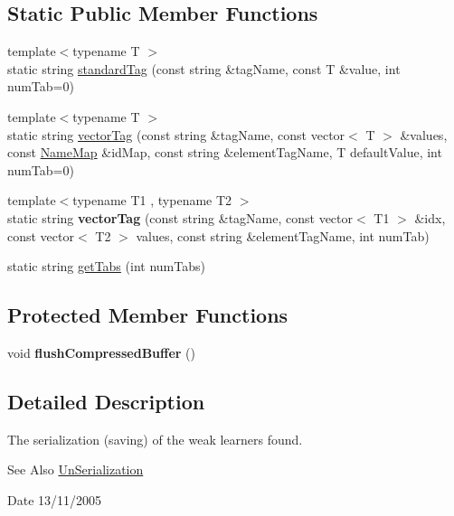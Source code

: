 \subsection*{Static Public Member Functions}
\begin{DoxyCompactItemize}
\item 
{\footnotesize template$<$typename T $>$ }\\static string \hyperlink{classMultiBoost_1_1Serialization_ad75f8e13f32130be1ba110393598f50e}{standard\-Tag} (const string \&tag\-Name, const T \&value, int num\-Tab=0)
\item 
{\footnotesize template$<$typename T $>$ }\\static string \hyperlink{classMultiBoost_1_1Serialization_aeb1f7e2ddfd0e58d4f3d5a5ec78e9f33}{vector\-Tag} (const string \&tag\-Name, const vector$<$ T $>$ \&values, const \hyperlink{classMultiBoost_1_1NameMap}{Name\-Map} \&id\-Map, const string \&element\-Tag\-Name, T default\-Value, int num\-Tab=0)
\item 
\hypertarget{classMultiBoost_1_1Serialization_ab5d8d0ae3de812cf2d7e38c5ce16a64e}{{\footnotesize template$<$typename T1 , typename T2 $>$ }\\static string {\bfseries vector\-Tag} (const string \&tag\-Name, const vector$<$ T1 $>$ \&idx, const vector$<$ T2 $>$ values, const string \&element\-Tag\-Name, int num\-Tab)}\label{classMultiBoost_1_1Serialization_ab5d8d0ae3de812cf2d7e38c5ce16a64e}

\item 
static string \hyperlink{classMultiBoost_1_1Serialization_a0c0e939afedf8c527ee014737583ae78}{get\-Tabs} (int num\-Tabs)
\end{DoxyCompactItemize}
\subsection*{Protected Member Functions}
\begin{DoxyCompactItemize}
\item 
\hypertarget{classMultiBoost_1_1Serialization_a2e68086de33875ac58a1b927298ea084}{void {\bfseries flush\-Compressed\-Buffer} ()}\label{classMultiBoost_1_1Serialization_a2e68086de33875ac58a1b927298ea084}

\end{DoxyCompactItemize}


\subsection{Detailed Description}
The serialization (saving) of the weak learners found. \begin{DoxySeeAlso}{See Also}
\hyperlink{classMultiBoost_1_1UnSerialization}{Un\-Serialization} 
\end{DoxySeeAlso}
\begin{DoxyDate}{Date}
13/11/2005 
\end{DoxyDate}


